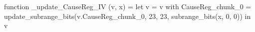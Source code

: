 function _update_CauseReg_IV (v, x) = let v = { v with CauseReg_chunk_0 = update_subrange_bits(v.CauseReg_chunk_0, 23, 23, subrange_bits(x, 0, 0)) } in
  v
